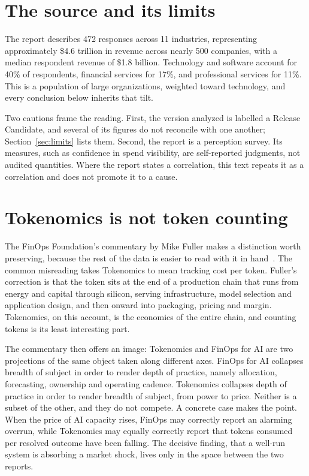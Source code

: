 \documentclass[11pt,a4paper]{article}
\begin{document}
\section{The source and its limits}

The report describes 472 responses across 11 industries, representing approximately \$4.6 trillion in revenue across nearly 500 companies, with a median respondent revenue of \$1.8 billion. Technology and software account for 40\% of respondents, financial services for 17\%, and professional services for 11\%. This is a population of large organizations, weighted toward technology, and every conclusion below inherits that tilt.

Two cautions frame the reading. First, the version analyzed is labelled a Release Candidate, and several of its figures do not reconcile with one another; Section~\ref{sec:limits} lists them. Second, the report is a perception survey. Its measures, such as confidence in spend visibility, are self-reported judgments, not audited quantities. Where the report states a correlation, this text repeats it as a correlation and does not promote it to a cause.

\section{Tokenomics is not token counting}

The FinOps Foundation's commentary by Mike Fuller makes a distinction worth preserving, because the rest of the data is easier to read with it in hand~\cite{fuller2026}. The common misreading takes Tokenomics to mean tracking cost per token. Fuller's correction is that the token sits at the end of a production chain that runs from energy and capital through silicon, serving infrastructure, model selection and application design, and then onward into packaging, pricing and margin. Tokenomics, on this account, is the economics of the entire chain, and counting tokens is its least interesting part.

The commentary then offers an image: Tokenomics and FinOps for AI are two projections of the same object taken along different axes. FinOps for AI collapses breadth of subject in order to render depth of practice, namely allocation, forecasting, ownership and operating cadence. Tokenomics collapses depth of practice in order to render breadth of subject, from power to price. Neither is a subset of the other, and they do not compete. A concrete case makes the point. When the price of AI capacity rises, FinOps may correctly report an alarming overrun, while Tokenomics may equally correctly report that tokens consumed per resolved outcome have been falling. The decisive finding, that a well-run system is absorbing a market shock, lives only in the space between the two reports.
\end{document}
